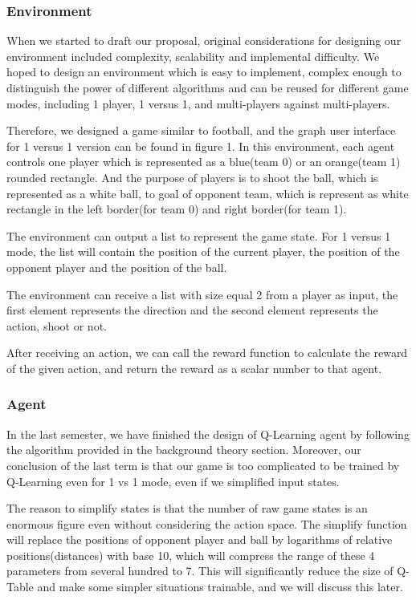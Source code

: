 \documentclass[12pt]{article}
\begin{document}
\subsubsection{Environment}
When we started to draft our proposal, original considerations for designing our environment included complexity, scalability and implemental difficulty. We hoped to design an environment which is easy to implement, complex enough to distinguish the power of different algorithms and can be reused for different game modes, including 1 player, 1 versus 1, and multi-players against multi-players.

Therefore, we designed a game similar to football, and the graph user interface for 1 versus 1 version can be found in figure 1. In this environment, each agent controls one player which is represented as a blue(team 0) or an orange(team 1) rounded rectangle. And the purpose of players is to shoot the ball, which is represented as a white ball, to goal of opponent team, which is represent as white rectangle in the left border(for team 0) and right border(for team 1).

The environment can output a list to represent the game state. For 1 versus 1 mode, the list will contain the position of the current player, the position of the opponent player and the position of the ball.

The environment can receive a list with size equal 2 from a player as input, the first element represents the direction and the second element represents the action, shoot or not. 

After receiving an action, we can call the reward function to calculate the reward of the given action, and return the reward as a scalar number to that agent.

\subsubsection{Agent}

In the last semester, we have finished the design of Q-Learning agent by following the algorithm provided in the background theory section. Moreover, our conclusion of the last term is that our game is too complicated to be trained by Q-Learning even for 1 vs 1 mode, even if we simplified input states.

The reason to simplify states is that the number of raw game states is an enormous figure even without considering the action space. The simplify function will replace the positions of opponent player and ball by logarithms of relative positions(distances) with base 10, which will compress the range of these 4 parameters from several hundred to 7. This will significantly reduce the size of Q-Table and make some simpler situations trainable, and we will discuss this later.
\end{document}
